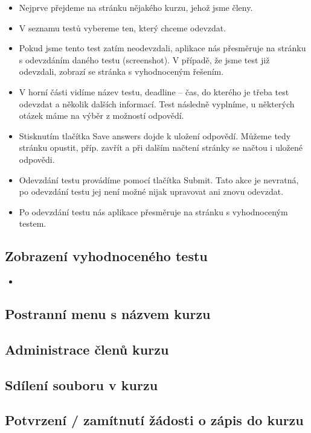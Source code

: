 \begin{itemize}
	\item Nejprve přejdeme na stránku nějakého kurzu, jehož jsme členy.
	\item V seznamu testů vybereme ten, který chceme odevzdat.
	\item Pokud jsme tento test zatím neodevzdali, aplikace nás přesměruje na stránku s odevzdáním daného testu (screenshot). V případě, že jsme test již odevzdali, zobrazí se stránka s vyhodnoceným řešením.
	\item V horní části vidíme název testu, deadline -- čas, do kterého je třeba test odevzdat a několik dalších informací. Test následně vyplníme, u některých otázek máme na výběr z možností odpovědí.
	\item Stisknutím tlačítka Save answers dojde k uložení odpovědí. Můžeme tedy stránku opustit, příp. zavřít a při dalším načtení stránky se načtou i uložené odpovědi.
	\item Odevzdání testu provádíme pomocí tlačítka Submit. Tato akce je nevratná, po odevzdání testu jej není možné nijak upravovat ani znovu odevzdat.
	\item Po odevzdání testu nás aplikace přesměruje na stránku s vyhodnoceným testem.
\end{itemize}

\subsection{Zobrazení vyhodnoceného testu}

\begin{itemize}
	\item 
\end{itemize}

\subsection{Postranní menu s názvem kurzu}



\subsection{Administrace členů kurzu}

\subsection{Sdílení souboru v kurzu}

\subsection{Potvrzení / zamítnutí žádosti o zápis do kurzu}


